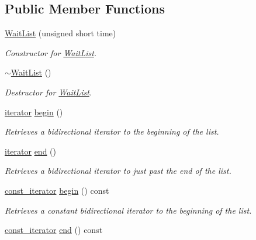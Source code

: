 \subsection*{\-Public \-Member \-Functions}
\begin{DoxyCompactItemize}
\item 
\hyperlink{classLibWheel_1_1WaitList_af1f5333add29ca138c385c15581ea57e}{\-Wait\-List} (unsigned short time)
\begin{DoxyCompactList}\small\item\em \-Constructor for \hyperlink{classLibWheel_1_1WaitList}{\-Wait\-List}. \end{DoxyCompactList}\item 
\hyperlink{classLibWheel_1_1WaitList_ad1d70367da51da742eed56e1a978cc25}{$\sim$\-Wait\-List} ()
\begin{DoxyCompactList}\small\item\em \-Destructor for \hyperlink{classLibWheel_1_1WaitList}{\-Wait\-List}. \end{DoxyCompactList}\item 
\hyperlink{classLibWheel_1_1WaitList_a197f2582847b549a89b833d2eb153b1c}{iterator} \hyperlink{classLibWheel_1_1WaitList_ae258ef53fb5bd852f91176247627ecea}{begin} ()
\begin{DoxyCompactList}\small\item\em \-Retrieves a bidirectional iterator to the beginning of the list. \end{DoxyCompactList}\item 
\hyperlink{classLibWheel_1_1WaitList_a197f2582847b549a89b833d2eb153b1c}{iterator} \hyperlink{classLibWheel_1_1WaitList_a82a5b14fc1a9978a18dd6aa7fd62792d}{end} ()
\begin{DoxyCompactList}\small\item\em \-Retrieves a bidirectional iterator to just past the end of the list. \end{DoxyCompactList}\item 
\hyperlink{classLibWheel_1_1WaitList_a016ac87f7ff3d47c628a091581baa840}{const\-\_\-iterator} \hyperlink{classLibWheel_1_1WaitList_a375db0c5e7badccefac1f1cf61128343}{begin} () const 
\begin{DoxyCompactList}\small\item\em \-Retrieves a constant bidirectional iterator to the beginning of the list. \end{DoxyCompactList}\item 
\hyperlink{classLibWheel_1_1WaitList_a016ac87f7ff3d47c628a091581baa840}{const\-\_\-iterator} \hyperlink{classLibWheel_1_1WaitList_ac4e21e5c74dbe0483fe065364ee28d58}{end} () const 

\end{DoxyCompactItemize}

